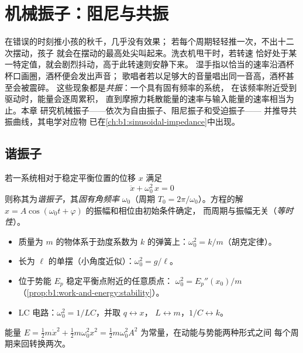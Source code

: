  \chapter{机械振子：阻尼与共振}\label{ch:b1:oscillators-resonance}

在错误的时刻推小孩的秋千，几乎没有效果；
若每个周期轻轻推一次，不出十二次摆动，孩子
就会在摆动的最高处尖叫起来。洗衣机甩干时，若转速
恰好处于某一特定值，就会剧烈抖动，高于此转速则安静下来。
湿手指以恰当的速率沿酒杯杯口画圈，酒杯便会发出声音；
歌唱者若以足够大的音量唱出同一音高，酒杯甚至会被震碎。
这些现象都是\emph{共振}：一个具有固有频率的系统，
在该频率附近受到驱动时，能量会逐周累积，
直到摩擦力耗散能量的速率与输入能量的速率相当为止。本章
研究机械振子——依次为自由振子、阻尼振子和受迫振子——
并推导共振曲线，其电学对应物
已在\cref{ch:b1:sinusoidal-impedance}中出现。

\section{谐振子}

\begin{definition}[谐振子]\label{def:b1:oscillators-resonance:harmonic}
若一系统相对于稳定平衡位置的位移 $x$ 满足
\[
\ddot x + \omega_0^2\,x = 0
\]
则称其为\emph{谐振子}，其\emph{固有角频率}
$\omega_0$（周期 $T_0 = 2\pi/\omega_0$）。方程的解 $x = A\cos(\omega_0t
+ \varphi)$ 的振幅和相位由初始条件确定，
而周期与振幅无关（\emph{等时性}）。
\end{definition}

\begin{proposition}[谐振子的来源]\label{prop:b1:oscillators-resonance:sources}
\begin{itemize}
  \item 质量为 $m$ 的物体系于劲度系数为 $k$ 的弹簧上：$\omega_0^2 = k/m$（胡克定律）。
  \item 长为 $\ell$ 的单摆（小角度近似）：$\omega_0^2 = g/\ell$。
  \item 位于势能 $E_p$ 稳定平衡点附近的任意质点：
        $\omega_0^2 = E_p''(x_0)/m$（\cref{prop:b1:work-and-energy:stability}）。
  \item LC 电路：$\omega_0^2 = 1/LC$，并取 $q \leftrightarrow x$，
        $L \leftrightarrow m$，$1/C \leftrightarrow k$。
\end{itemize}
能量 $E = \tfrac12 m\dot x^2 + \tfrac12 m\omega_0^2x^2 = \tfrac12
m\omega_0^2A^2$ 为常量，在动能与势能两种形式之间
每个周期来回转换两次。
\end{proposition}

